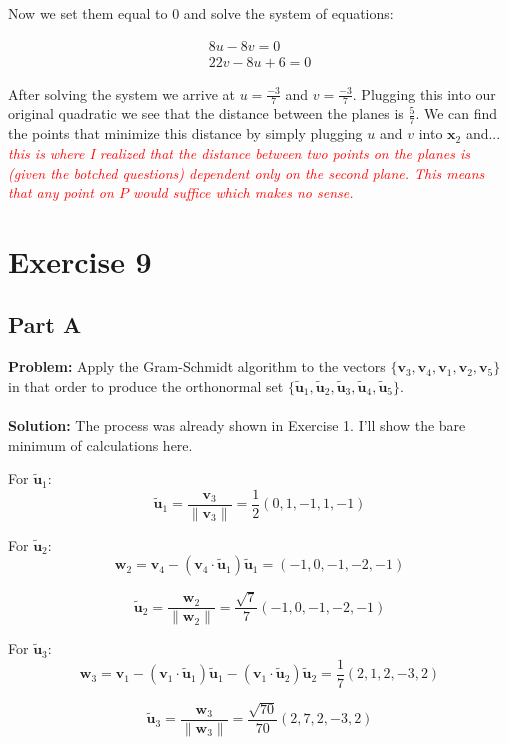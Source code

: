 \documentclass{article}
\begin{document}
Now we set them equal to 0 and solve the system of equations:

\begin{gather*}
  8u-8v=0\\
  22v-8u+6=0
\end{gather*}

After solving the system we arrive at $u=\frac{-3}{7}$ and $v=\frac{-3}{7}$. Plugging this into our original quadratic we see that the distance between the planes is $\frac{5}{7}$. We can find the points that minimize this distance by simply plugging $u$ and $v$ into $\mathbf x_2$ and... \textit{\textcolor{red}{this is where I realized that the distance between two points on the planes is (given the botched questions) dependent only on the second plane. This means that any point on $P$ would suffice which makes no sense.}}

\section*{Exercise 9}
\subsection*{Part A}
\textbf{Problem:} Apply the Gram-Schmidt algorithm to the vectors $\{\mathbf v_3, \mathbf v_4, \mathbf v_1, \mathbf v_2, \mathbf v_5\}$ in that order to produce the orthonormal set $\{\tilde{\mathbf u}_1, \tilde{\mathbf u}_2, \tilde{\mathbf u}_3, \tilde{\mathbf u}_4, \tilde{\mathbf u}_5\}$.
\\\\
\textbf{Solution:} The process was already shown in Exercise 1. I'll show the bare minimum of calculations here.

For $\tilde{\mathbf u}_1$:
$$\tilde{\mathbf u}_1=\frac{\mathbf v_3}{\|\mathbf v_3\|}=\frac{1}{2}(0,1,-1,1,-1)$$

For $\tilde{\mathbf u}_2$:
$$\mathbf w_2=\mathbf v_4-(\mathbf v_4\cdot\tilde{\mathbf u}_1)\tilde{\mathbf u}_1=(-1,0,-1,-2,-1)$$

$$\tilde{\mathbf u}_2=\frac{\mathbf w_2}{\|\mathbf w_2\|}=\frac{\sqrt 7}{7}(-1,0,-1,-2,-1)$$

For $\tilde{\mathbf u}_3$:
$$\mathbf w_3=\mathbf v_1-(\mathbf v_1\cdot\tilde{\mathbf u}_1)\tilde{\mathbf u}_1-(\mathbf v_1\cdot\tilde{\mathbf u}_2)\tilde{\mathbf u}_2=\frac{1}{7}(2,1,2,-3,2)$$

$$\tilde{\mathbf u}_3=\frac{\mathbf w_3}{\|\mathbf w_3\|}=\frac{\sqrt{70}}{70}(2,7,2,-3,2)$$
\end{document}
